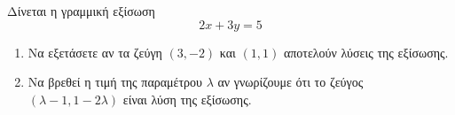 Δίνεται η γραμμική εξίσωση
\[ 2x+3y=5 \]
\begin{enumerate}
\item Να εξετάσετε αν τα ζεύγη $ (3,-2) $ και $ (1,1) $ αποτελούν λύσεις της εξίσωσης.
\item Να βρεθεί η τιμή της παραμέτρου $ \lambda $ αν γνωρίζουμε ότι το ζεύγος $ (\lambda-1,1-2\lambda) $ είναι λύση της εξίσωσης.
\end{enumerate}
